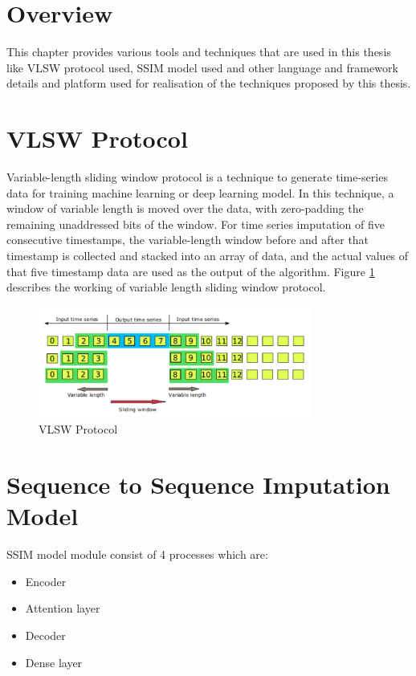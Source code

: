 \section{Overview}
This chapter provides various tools and techniques that are used in this thesis like VLSW protocol used, SSIM model used and other language and framework details and platform used for realisation of the techniques proposed by this thesis.

\section{VLSW Protocol}
Variable-length sliding window protocol is a technique to generate time-series data for training machine learning or deep learning model. In this technique, a window of variable length is moved over the data, with zero-padding the remaining unaddressed bits of the window. For time series imputation of five consecutive timestamps, the variable-length window before and after that timestamp is collected and stacked into an array of data, and the actual values of that five timestamp data are used as the output of the algorithm. Figure \ref{fig:vlsw} describes the working of variable length sliding window protocol.

\begin{figure}[ht]
	\centering
	\includegraphics[width=0.8\textwidth]{images/vlsw.png}
	\caption{VLSW Protocol}
	\label{fig:vlsw}
\end{figure}

\section{Sequence to Sequence Imputation Model}
SSIM model module consist of 4 processes which are:
\begin{itemize}
\item Encoder
\item Attention layer
\item Decoder
\item Dense layer
\end{itemize}


